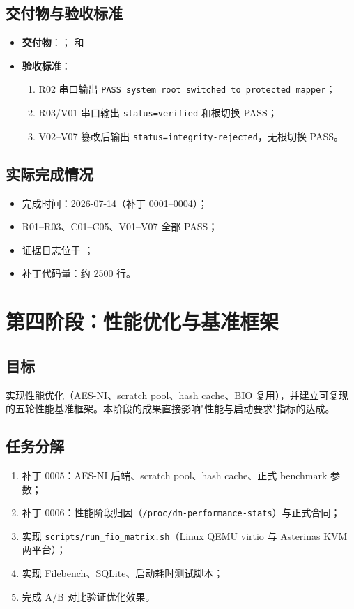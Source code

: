 \subsection{交付物与验收标准}
\begin{itemize}
    \item \textbf{交付物}：\texttt{}；\texttt{} 和 \texttt{}
    \item \textbf{验收标准}：
    \begin{enumerate}
        \item R02 串口输出 \texttt{PASS system root switched to protected mapper}；
        \item R03/V01 串口输出 \texttt{status=verified} 和根切换 PASS；
        \item V02--V07 篡改后输出 \texttt{status=integrity-rejected}，无根切换 PASS。
    \end{enumerate}
\end{itemize}

\subsection{实际完成情况}
\begin{itemize}
    \item 完成时间：2026-07-14（补丁 0001--0004）；
    \item R01--R03、C01--C05、V01--V07 全部 PASS；
    \item 证据日志位于 \texttt{}；
    \item 补丁代码量：约 2500 行。
\end{itemize}

\section{第四阶段：性能优化与基准框架}

\subsection{目标}
实现性能优化（AES-NI、scratch pool、hash cache、BIO 复用），并建立可复现的五轮性能基准框架。本阶段的成果直接影响"性能与启动要求"指标的达成。

\subsection{任务分解}
\begin{enumerate}
    \item 补丁 0005：AES-NI 后端、scratch pool、hash cache、正式 benchmark 参数；
    \item 补丁 0006：性能阶段归因（\texttt{/proc/dm-performance-stats}）与正式合同；
    \item 实现 \texttt{scripts/run\_fio\_matrix.sh}（Linux QEMU virtio 与 Asterinas KVM 两平台）；
    \item 实现 Filebench、SQLite、启动耗时测试脚本；
    \item 完成 A/B 对比验证优化效果。
\end{enumerate}

